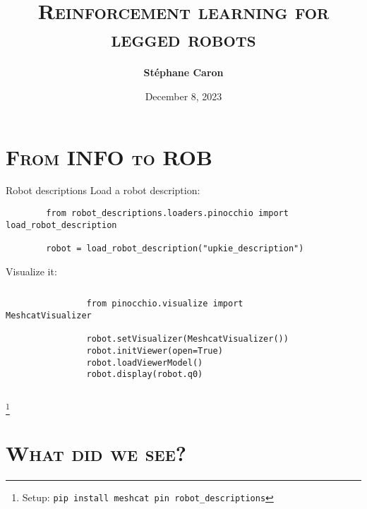 \documentclass[9pt, aspectratio=43]{beamer}
\title{
    \textsc{Reinforcement learning for legged robots}
}
\author{\textbf{St\'ephane Caron}}
\date{December 8, 2023}
\institute{Inria}
\newcommand\blfootnote[1]{%
  \begingroup
  \renewcommand\thefootnote{}%
  \footnote{#1}%
  \addtocounter{footnote}{-1}%
  \endgroup
}
\begin{document}
\maketitle


\section*{\textsc{From INFO to ROB}}


\begin{frame}[fragile]{Robot descriptions}
    Load a robot description:
    \begin{verbatim}
        from robot_descriptions.loaders.pinocchio import load_robot_description

        robot = load_robot_description("upkie_description")
    \end{verbatim}
    Visualize it:
    \begin{columns}
        \begin{column}{0.75\columnwidth}
            \begin{verbatim}
                from pinocchio.visualize import MeshcatVisualizer

                robot.setVisualizer(MeshcatVisualizer())
                robot.initViewer(open=True)
                robot.loadViewerModel()
                robot.display(robot.q0)
            \end{verbatim}
        \end{column}
        \begin{column}{0.24\columnwidth}
            \begin{figure}
                \centering
            \end{figure}
        \end{column}
    \end{columns}
    \blfootnote{
        Setup: \texttt{pip install meshcat pin robot_descriptions}
    }
\end{frame}

\section*{\textsc{What did we see?}}
\end{document}
